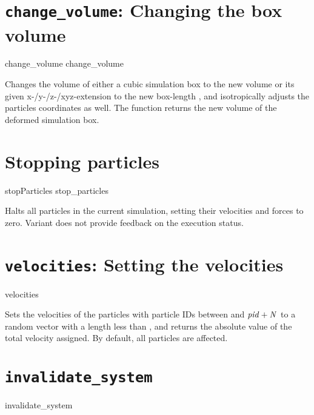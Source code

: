 \section{\texttt{change_volume}: Changing the box volume}

\begin{essyntax}
   change_volume  
   change_volume  
\end{essyntax}
Changes the volume of either a cubic simulation box to the new volume
 or its given x-/y-/z-/xyz-extension to the new
box-length , and isotropically adjusts the
particles coordinates as well. The function returns the new volume of
the deformed simulation box.

\section{Stopping particles}

\begin{essyntax}
   stopParticles
   stop_particles
\end{essyntax}
Halts all particles in the current simulation, setting their
velocities and forces to zero. Variant  does not provide
feedback on the execution status.

\section{\texttt{velocities}: Setting the velocities}
\begin{essyntax}
  velocities  
\end{essyntax}
Sets the velocities of the particles with particle IDs between
 and $\mathrm{\mathit{pid}}+\mathrm{\mathit{N}}$ to a random vector with a length
less than , and returns the absolute value of the
total velocity assigned. By default, all particles are affected.

\section{\texttt{invalidate_system}}
\begin{essyntax}
  invalidate_system
\end{essyntax}


